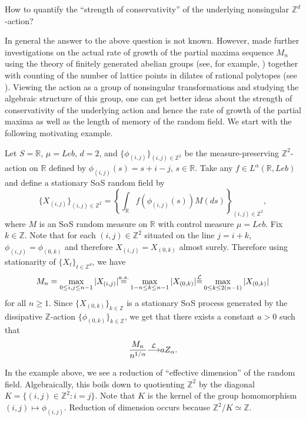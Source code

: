 \documentclass[12pt]{amsart}
\begin{document}
\begin{qn} How to quantify the ``strength of conservativity'' of the underlying nonsingular ${\mathbb{Z}^d}$-action?
\end{qn}

In general the answer to the above question is not known. However, \cite{roy:samorodnitsky:2008} made further investigations on
the actual rate of growth of the partial maxima sequence $M_n$ using
the theory of finitely generated abelian groups (see, for example,
\cite{lang:2002}) together with counting of the number of lattice
points in dilates of rational polytopes (see \cite{deloera:2005}). Viewing the action as a
group of nonsingular transformations and studying the algebraic
structure of this group, one can get better ideas about the strength of conservativity of the underlying action and hence the
rate of growth of the partial maxima as well as the length of memory
of the random field. We start with the following motivating example.

\begin{example} \label{example_motivating_ab_gp} \textnormal{Let $S=\mathbb{R}$, $\mu = Leb$, $d=2$, and $\{\phi_{(i,j)}\}_{(i,j) \in \mathbb{Z}^2}$ be the measure-preserving $\mathbb{Z}^2$-action on $\mathbb{R}$ defined by
$\phi_{(i,j)}(s)=s+i-j$, $s \in \mathbb{R}$. Take any $f \in L^\alpha(\mathbb{R}, Leb)$ and define a stationary S$\alpha$S random field by}
\[
\{X_{(i,j)}\}_{(i,j) \in \mathbb{Z}^2} = \left\{\int_\mathbb{R} f (\phi_{(i,j)}(s)) M(ds) \right\}_{(i,j) \in \mathbb{Z}^2},
\]
\textnormal{where $M$ is an S$\alpha$S random measure on $\mathbb{R}$ with control measure $\mu = Leb$. Fix $k \in \mathbb{Z}$. Note that for each $(i, j) \in \mathbb{Z}^2$ situated on the line $j=i+k$, $\phi_{(i,j)}=\phi_{(0,k)}$ and therefore $X_{(i,j)} =X_{(0,k)}$ almost surely.}
\textnormal{Therefore using stationarity of ${\{X_t\}_{t \in \mathbb{Z}^d}}$, we have}
\[
M_n = \max_{0 \leq i,j\leq n-1} |X_{(i,j)}| {\stackrel{a.s.}{=}} \max_{1-n \leq k\leq n-1} |X_{(0,k)}| {\stackrel{\footnotesize{\mathcal{L}}}{=}} \max_{0 \leq k\leq 2(n-1)} |X_{(0,k)}|
\]
\textnormal{for all $n \geq 1$. Since $\{X_{(0,k)}\}_{k \in \mathbb{Z}}$ is a stationary S$\alpha$S process generated by the dissipative $\mathbb{Z}$-action $\{\phi_{(0,k)}\}_{k \in \mathbb{Z}}$, we get that there exists a constant $a>0$ such that}
\[
\frac{M_n}{n^{1/\alpha}} {\stackrel{\footnotesize{\mathcal{L}}}{\longrightarrow}} a Z_\alpha.
\]
\end{example}

In the example above, we see a reduction of ``effective dimension'' of the random field. Algebraically, this boils down to quotienting $\mathbb{Z}^2$ by the diagonal $K=\{(i,j) \in \mathbb{Z}^2: i=j\}$. Note that $K$ is the kernel of the group homomorphism $(i,j) \mapsto \phi_{(i,j)}$. Reduction of dimension occurs because $\mathbb{Z}^2/K \simeq \mathbb{Z}$.
\end{document}
